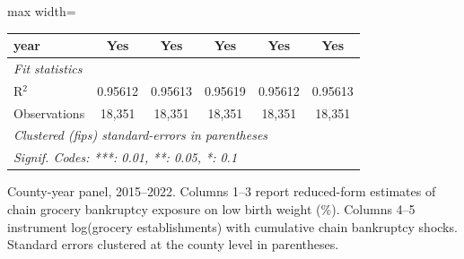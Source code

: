 \begin{table}[htbp]
\begin{adjustbox}{max width=\textwidth}
\begin{tabular}{lccccc}
      year                              & Yes           & Yes           & Yes            & Yes          & Yes\\  
      \midrule
      \emph{Fit statistics}\\
      R$^2$                             & 0.95612       & 0.95613       & 0.95619        & 0.95612      & 0.95613\\  
      Observations                      & 18,351        & 18,351        & 18,351         & 18,351       & 18,351\\  
      \midrule \midrule
      \multicolumn{6}{l}{\emph{Clustered (fips) standard-errors in parentheses}}\\
      \multicolumn{6}{l}{\emph{Signif. Codes: ***: 0.01, **: 0.05, *: 0.1}}\\
   \end{tabular}
   \end{adjustbox}

   \par \raggedright 
   County-year panel, 2015--2022. Columns 1--3 report reduced-form estimates of chain grocery bankruptcy exposure on low birth weight (\%). Columns 4--5 instrument log(grocery establishments) with cumulative chain bankruptcy shocks. Standard errors clustered at the county level in parentheses.
\end{table}


